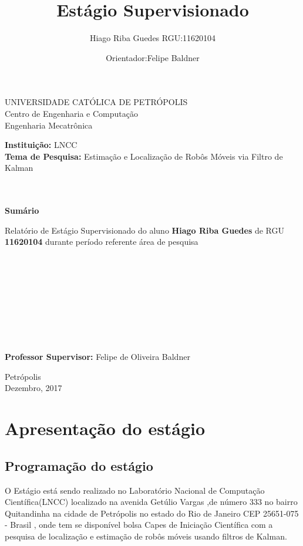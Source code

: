 \documentclass[11pt,a4paper]{article}
\title{Estágio Supervisionado}
\author{Hiago Riba Guedes RGU:11620104}
\date{Orientador:Felipe Baldner}
\begin{document}
\begin{center}
{\Large UNIVERSIDADE CATÓLICA DE PETRÓPOLIS}\\
Centro de Engenharia e Computação\\
Engenharia Mecatrônica
\end{center}
\vspace{40mm}
\textbf{Instituição: }LNCC \\
\textbf{Tema de Pesquisa: }Estimação e Localização de Robôs Móveis via Filtro de Kalman\\\\\\
\begin{center}
\textbf{Sumário}
\end{center}

Relatório de Estágio Supervisionado do aluno \textbf{Hiago Riba Guedes} de RGU \textbf{11620104} durante período referente área de pesquisa 
\\ \\ \\ \\ \\ \\ \\ \\ \\ \\
\textbf{Professor Supervisor: }Felipe de Oliveira Baldner
\vfill
\begin{center}
Petrópolis\\
Dezembro, 2017
\end{center}
\thispagestyle{empty}
\newpage
\tableofcontents
\newpage
\section{Apresentação do estágio}
\subsection{Programação do estágio}

\hspace{1.5cm} O Estágio está sendo realizado no Laboratório Nacional de Computação Científica(LNCC) localizado na avenida Getúlio Vargas ,de número 333 no bairro  Quitandinha na cidade de 
Petrópolis no estado do  Rio de Janeiro
CEP 25651-075 - Brasil , onde tem se disponível bolsa Capes de Iniciação Científica com a pesquisa de localização e estimação de robôs móveis usando filtros de Kalman.
\end{document}
